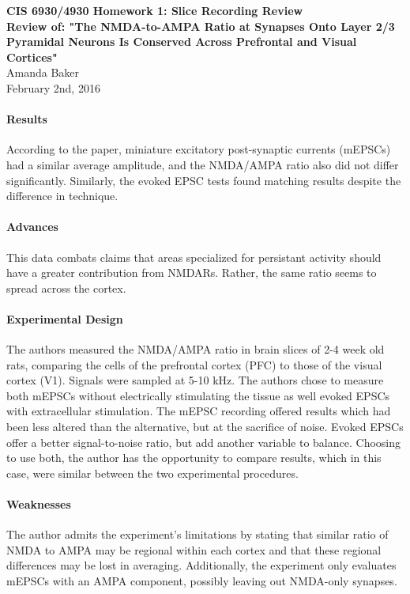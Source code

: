 \documentclass[11pt]{article}
\begin{document}
\begin{center}
{\large {\bf CIS 6930/4930 Homework 1: Slice Recording Review}}\\
{\normalsize {\bf Review of: "The NMDA-to-AMPA Ratio at Synapses Onto Layer 2/3 Pyramidal Neurons
Is Conserved Across Prefrontal and Visual Cortices"}}\\
Amanda Baker \\
February 2nd, 2016 \\
\end{center}

\paragraph{Results}
According to the paper, miniature excitatory post-synaptic currents (mEPSCs) had
a similar average amplitude, and the NMDA/AMPA ratio also did not differ significantly.
Similarly, the evoked EPSC tests found matching results despite the difference in
technique.

\paragraph{Advances}
This data combats claims that areas specialized for persistant activity should have
a greater contribution from NMDARs.  Rather, the same ratio seems to spread across
the cortex.

\paragraph{Experimental Design}
The authors measured the NMDA/AMPA ratio in brain slices of 2-4 week old rats, comparing
the cells of the prefrontal cortex (PFC) to those of the visual cortex (V1).  Signals
were sampled at 5-10 kHz.  The authors chose to measure both mEPSCs without electrically
stimulating the tissue as well evoked EPSCs with extracellular stimulation.  The mEPSC
recording offered results which had been less altered than the alternative, but at
the sacrifice of noise.  Evoked EPSCs offer a better signal-to-noise ratio, but add
another variable to balance.  Choosing to use both, the author has the opportunity
to compare results, which in this case, were similar between the two experimental
procedures.

\paragraph{Weaknesses}
The author admits the experiment's limitations by stating that similar ratio of NMDA
to AMPA may be regional within each cortex and that these regional differences may
be lost in averaging.  Additionally, the experiment only evaluates mEPSCs with an
AMPA component, possibly leaving out NMDA-only synapses.
\end{document}

